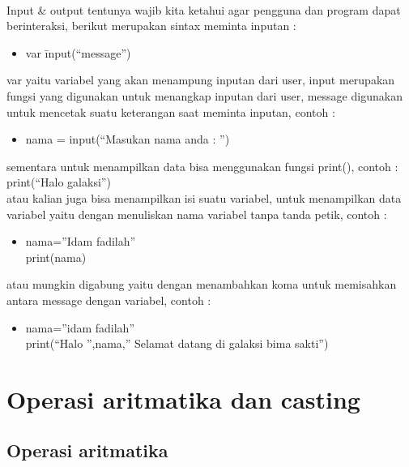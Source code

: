 \documentclass[a4paper,12pt]{report}
\begin{document}
\paragraph{}
\graphicspath{{images}}
Input \& output tentunya wajib kita ketahui agar pengguna dan program dapat berinteraksi, berikut merupakan sintax meminta inputan :\\
\begin{itemize}
	\item var \= input(“message”)\\
\end{itemize}
var yaitu variabel yang akan menampung inputan dari user, input merupakan fungsi yang digunakan untuk menangkap inputan dari user, message digunakan untuk mencetak suatu keterangan saat meminta inputan, contoh :\\
\begin{itemize}
	\item nama = input(“Masukan nama anda : ”)\\
\end{itemize}
sementara untuk menampilkan data bisa menggunakan fungsi print(), contoh :\\
print(“Halo galaksi”)\\
atau kalian juga bisa menampilkan isi suatu variabel, untuk menampilkan data variabel yaitu dengan menuliskan nama variabel tanpa tanda petik, contoh :\\
\begin{itemize}
	\item nama=”Idam fadilah”\\
print(nama)\\
\end{itemize}
atau mungkin digabung  yaitu dengan menambahkan koma untuk memisahkan antara message dengan variabel, contoh :\\
\begin{itemize}
	\item nama=”idam fadilah”\\
print(“Halo ”,nama,” Selamat datang di galaksi bima sakti”)\\
\end{itemize}
\section{Operasi aritmatika dan casting}
\subsection{Operasi aritmatika}
\end{document}
